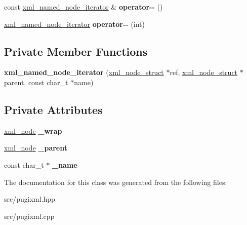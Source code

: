 \begin{DoxyCompactItemize}
\item 
\mbox{\label{classpugi_1_1xml__named__node__iterator_aaee9df71be9b3a08f871cbf420d8384d}} 
const \hyperlink{classpugi_1_1xml__named__node__iterator}{xml\+\_\+named\+\_\+node\+\_\+iterator} \& {\bfseries operator-\/-\/} ()
\item 
\mbox{\label{classpugi_1_1xml__named__node__iterator_af5b1c61a813276537774d60e32c6408c}} 
\hyperlink{classpugi_1_1xml__named__node__iterator}{xml\+\_\+named\+\_\+node\+\_\+iterator} {\bfseries operator-\/-\/} (int)
\end{DoxyCompactItemize}
\subsection*{Private Member Functions}
\begin{DoxyCompactItemize}
\item 
\mbox{\label{classpugi_1_1xml__named__node__iterator_a5f4e9385149738dad323283157d9df43}} 
{\bfseries xml\+\_\+named\+\_\+node\+\_\+iterator} (\hyperlink{structpugi_1_1xml__node__struct}{xml\+\_\+node\+\_\+struct} $\ast$ref, \hyperlink{structpugi_1_1xml__node__struct}{xml\+\_\+node\+\_\+struct} $\ast$parent, const char\+\_\+t $\ast$name)
\end{DoxyCompactItemize}
\subsection*{Private Attributes}
\begin{DoxyCompactItemize}
\item 
\mbox{\label{classpugi_1_1xml__named__node__iterator_a62e13b948f65694775517aff8f2461a0}} 
\hyperlink{classpugi_1_1xml__node}{xml\+\_\+node} {\bfseries \+\_\+wrap}
\item 
\mbox{\label{classpugi_1_1xml__named__node__iterator_ae284759b845fadf864ca8f178707dddc}} 
\hyperlink{classpugi_1_1xml__node}{xml\+\_\+node} {\bfseries \+\_\+parent}
\item 
\mbox{\label{classpugi_1_1xml__named__node__iterator_a48bb2acdf9d799fa8c00e7fe60e09c83}} 
const char\+\_\+t $\ast$ {\bfseries \+\_\+name}
\end{DoxyCompactItemize}


The documentation for this class was generated from the following files\+:\begin{DoxyCompactItemize}
\item 
src/pugixml.\+hpp\item 
src/pugixml.\+cpp\end{DoxyCompactItemize}
